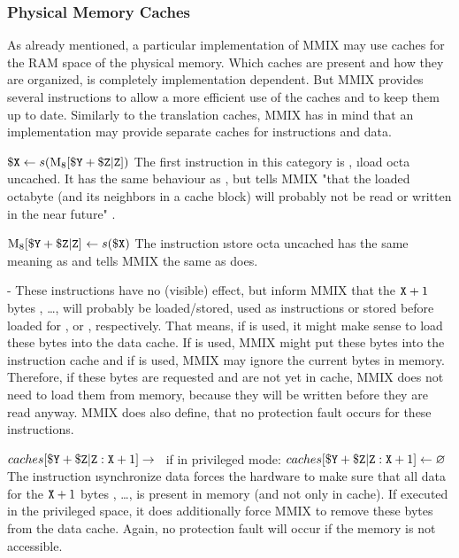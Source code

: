 \subsubsection{Physical Memory Caches}

As already mentioned, a particular implementation of MMIX may use caches for the RAM space of the physical memory. Which caches are present and how they are organized, is completely implementation dependent. But MMIX provides several instructions to allow a more efficient use of the caches and to keep them up to date. Similarly to the translation caches, MMIX has in mind that an implementation may provide separate caches for instructions and data.

\instrtbl
	{}
	{$\dr{X} \leftarrow s(\vmem{8}{\dr{Y} + \udrim{Z}})$}
\noindent The first instruction in this category is , \i{load octa uncached}. It has  the same behaviour as , but tells MMIX "that the loaded octabyte (and its neighbors in a cache block) will probably not be read or written in the near future" \citep[pg. 24]{mmix-doc}.

\instrtbl
	{}
	{$\vmem{8}{\dr{Y} + \udrim{Z}}~\leftarrow s(\dr{X})$}
\noindent The instruction \i{store octa uncached} has the same meaning as  and tells MMIX the same as  does. \citep[pg. 24]{mmix-doc}

\instrtbl
	{}
	{-}
\noindent These instructions have no (visible) effect, but inform MMIX that the ${\tt X}+1$ bytes , \dots,  will probably be loaded/stored, used as instructions or stored before loaded for ,  or , respectively. That means, if  is used, it might make sense to load these bytes into the data cache. If  is used, MMIX might put these bytes into the instruction cache and if  is used, MMIX may ignore the current bytes in memory. Therefore, if these bytes are requested and are not yet in cache, MMIX does not need to load them from memory, because they will be written before they are read anyway. MMIX does also define, that no protection fault occurs for these instructions. \citep[pg. 24]{mmix-doc}

\instrtbltwo
	{}
	{$caches[{\tt \$Y} + {\tt \$Z}{\tt|Z}:{\tt X}+1] \rightarrow$~}
	{if in privileged mode: $caches[{\tt \$Y} + {\tt \$Z}{\tt|Z}:{\tt X}+1] \leftarrow \varnothing$}
\noindent The instruction \i{synchronize data} forces the hardware to make sure that all data for the ${\tt X}+1$ bytes , \dots,  is present in memory (and not only in cache). If executed in the privileged space, it does additionally force MMIX to remove these bytes from the data cache. Again, no protection fault will occur if the memory is not accessible. \citep[pg. 24]{mmix-doc}

